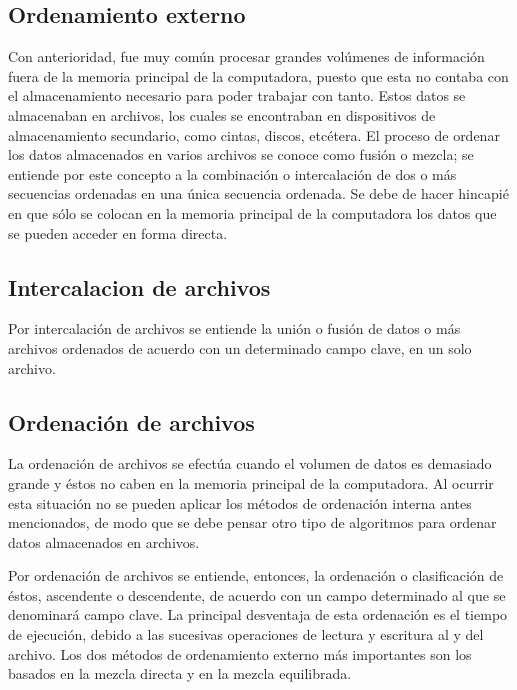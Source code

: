\documentclass[11pt]{article}
\begin{document}
\subsection{Ordenamiento externo}
\par
Con anterioridad, fue muy común procesar grandes volúmenes de información fuera de la memoria principal de la computadora, puesto que esta no contaba con el almacenamiento necesario para poder trabajar con tanto. Estos datos se almacenaban en archivos, los cuales se encontraban en dispositivos de almacenamiento secundario, como cintas, discos, etcétera. El proceso de ordenar los datos almacenados en varios archivos se conoce como fusión o mezcla; se entiende por este concepto a la combinación o intercalación de dos o más secuencias ordenadas en una única secuencia ordenada. Se debe de hacer hincapié en que sólo se colocan en la memoria principal de la computadora los datos que se pueden acceder en forma directa.

\subsection{Intercalacion de archivos}
\par
Por intercalación de archivos se entiende la unión o fusión de datos o más archivos ordenados de acuerdo con un determinado campo clave, en un solo archivo.

\subsection{Ordenación de archivos}
\par
La ordenación de archivos se efectúa cuando el volumen de datos es demasiado grande y éstos no caben en la memoria principal de la computadora. Al ocurrir esta situación no se pueden aplicar los métodos de ordenación interna antes mencionados, de modo que se debe pensar otro tipo de algoritmos para ordenar datos almacenados en archivos.
\par
Por ordenación de archivos se entiende, entonces, la ordenación o clasificación de éstos, ascendente o descendente, de acuerdo con un campo determinado al que se denominará campo clave. La principal desventaja de esta ordenación es el tiempo de ejecución, debido a las sucesivas operaciones de lectura y escritura al y del archivo. Los dos métodos de ordenamiento externo más importantes son los basados en la mezcla directa y en la mezcla equilibrada.
\end{document}
